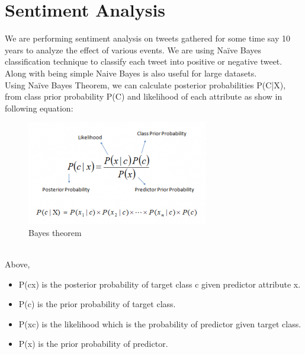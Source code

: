 \documentclass[journal, a4paper]{IEEEtran}
\begin{document}
\section{Sentiment Analysis}
	We are performing sentiment analysis on tweets gathered for some time say 10 years to analyze the effect of various events. We are using Naïve Bayes classification technique to classify each tweet into positive or negative tweet. Along with being simple Naive Bayes is also useful for large datasets.\\
    Using Naïve Bayes Theorem, we can calculate posterior probabilities P(C|X), from class prior probability P(C) and likelihood of each attribute as show in following equation:\\
    \begin{figure}[!hbt]
		\begin{center}
		\includegraphics[width=\columnwidth]{Bayes_rule}
%
		\caption{Bayes theorem}
		\label{fig:tf_plot}
		\end{center}
	\end{figure}
    \\Above,
   \begin{itemize}
  \item P(c\textbar x) is the posterior probability of target class c given predictor attribute x.
  \item P(c) is the prior probability of target class.
  \item P(x\textbar c) is the likelihood which is the probability of predictor given target class.
  \item P(x) is the prior probability of predictor.
\end{itemize}
\end{document}
